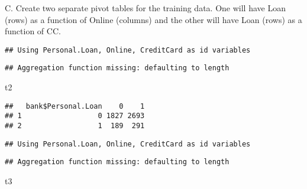 \documentclass[
]{article}
\newenvironment{Shaded}{\begin{snugshade}}{\end{snugshade}}
\newcommand{\FunctionTok}[1]{\textcolor[rgb]{0.00,0.00,0.00}{#1}}
\newcommand{\NormalTok}[1]{#1}
\newcommand{\OtherTok}[1]{\textcolor[rgb]{0.56,0.35,0.01}{#1}}
\newcommand{\SpecialCharTok}[1]{\textcolor[rgb]{0.00,0.00,0.00}{#1}}
\begin{document}
C. Create two separate pivot tables for the training data. One will have
Loan (rows) as a function of Online (columns) and the other will have
Loan (rows) as a function of CC.

\begin{Shaded}
\end{Shaded}

\begin{verbatim}
## Using Personal.Loan, Online, CreditCard as id variables
\end{verbatim}

\begin{verbatim}
## Aggregation function missing: defaulting to length
\end{verbatim}

\begin{Shaded}
\begin{Highlighting}[]
\NormalTok{t2}
\end{Highlighting}
\end{Shaded}

\begin{verbatim}
##   bank$Personal.Loan    0    1
## 1                  0 1827 2693
## 2                  1  189  291
\end{verbatim}

\begin{Shaded}
\end{Shaded}

\begin{verbatim}
## Using Personal.Loan, Online, CreditCard as id variables
\end{verbatim}

\begin{verbatim}
## Aggregation function missing: defaulting to length
\end{verbatim}

\begin{Shaded}
\begin{Highlighting}[]
\NormalTok{t3}
\end{Highlighting}
\end{Shaded}
\end{document}
